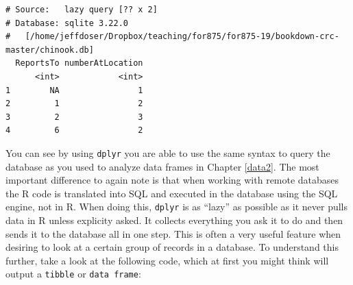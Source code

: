 \documentclass[]{krantz}
\makeatletter
\newenvironment{Shaded}{\begin{snugshade}}{\end{snugshade}}
\newcommand{\KeywordTok}[1]{\textcolor[rgb]{0.27,0.27,0.27}{\textbf{#1}}}
\newcommand{\DataTypeTok}[1]{\textcolor[rgb]{0.27,0.27,0.27}{#1}}
\newcommand{\StringTok}[1]{\textcolor[rgb]{0.5,0.5,0.5}{#1}}
\newcommand{\OperatorTok}[1]{\textcolor[rgb]{0.43,0.43,0.43}{\textbf{#1}}}
\newcommand{\NormalTok}[1]{#1}
\newenvironment{kframe}{%
\medskip{}
\setlength{\fboxsep}{.8em}
 \def\at@end@of@kframe{}%
 \ifinner\ifhmode%
  \def\at@end@of@kframe{\end{minipage}}%
  \begin{minipage}{\columnwidth}%
 \fi\fi%
 \def\FrameCommand##1{\hskip\@totalleftmargin \hskip-\fboxsep
 \colorbox{shadecolor}{##1}\hskip-\fboxsep
     \hskip-\linewidth \hskip-\@totalleftmargin \hskip\columnwidth}%
 \MakeFramed {\advance\hsize-\width
   \@totalleftmargin\z@ \linewidth\hsize
   \@setminipage}}%
 {\par\unskip\endMakeFramed%
 \at@end@of@kframe}
\renewenvironment{Shaded}{\begin{kframe}}{\end{kframe}}
\makeatother
\begin{document}
\begin{Shaded}
\end{Shaded}

\begin{verbatim}
# Source:   lazy query [?? x 2]
# Database: sqlite 3.22.0
#   [/home/jeffdoser/Dropbox/teaching/for875/for875-19/bookdown-crc-master/chinook.db]
  ReportsTo numberAtLocation
      <int>            <int>
1        NA                1
2         1                2
3         2                3
4         6                2
\end{verbatim}

You can see by using \texttt{dplyr} you are able to use the same syntax
to query the database as you used to analyze data frames in Chapter
\ref{data2}. The most important difference to again note is that when
working with remote databases the R code is translated into SQL and
executed in the database using the SQL engine, not in R. When doing
this, \texttt{dplyr} is as ``lazy'' as possible as it never pulls data
in R unless explicity asked. It collects everything you ask it to do and
then sends it to the database all in one step. This is often a very
useful feature when desiring to look at a certain group of records in a
database. To understand this further, take a look at the following code,
which at first you might think will output a \texttt{tibble} or
\texttt{data\ frame}:

\begin{Shaded}
\end{Shaded}
\end{document}
